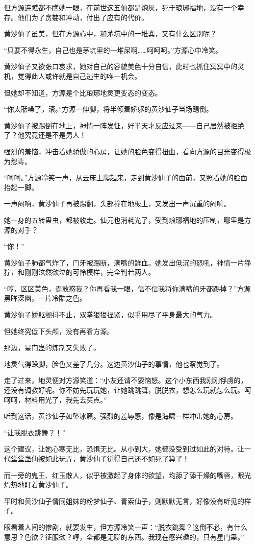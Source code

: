 \begin{this_body}
但方源连瞧都不瞧她一眼，在前世这五仙都是炮灰，死于琅琊福地，没有一个幸存。他们为了贪婪和冲动，付出了应有的代价。

黄沙仙子虽美，但在方源心中，和茅坑中的一堆粪，又有什么区别呢？

“只要不得永生，自己也是茅坑里的一堆屎啊……呵呵呵。”方源心中冷笑。

黄沙仙子又欲张口哀求，她对自己的容貌美色十分自信，此时也抓住冥冥中的灵机，觉得此人或许就是自己逃生的唯一机会。

但她却不知道，方源是个比琅琊地灵更变态的变态。

“你太聒噪了，滚。”方源一伸脚，将半倾着娇躯的黄沙仙子当场踢倒。

黄沙仙子被踢倒在地上，神情一阵发怔，好半天才反应过来——自己居然被拒绝了？他究竟还是不是男人！

强烈的羞恼，冲击着她骄傲的心房，让她的脸色变得扭曲，看向方源的目光变得极为怨毒。

“呵呵。”方源冷笑一声，从云床上爬起来，走到黄沙仙子的面前，又照着她的脸面抬起一脚。

一声闷响，黄沙仙子再被踢翻，头部撞在地板上，又发出一声沉重的闷响。

她一身的五转蛊虫，都被收走。仙元也消耗光了，受到琅琊福地的压制，哪里是方源的对手？

“你！”

黄沙仙子肺都气炸了，门牙被踢断，满嘴的鲜血。她发出低沉的怒吼，神情一片狰狞，和刚刚泫然欲泣的可怜模样，完全判若两人。

“哼，区区美色，焉敢惑我？你再看我一眼，信不信我将你满嘴的牙都踢掉？”方源黑眸深幽，一片冷酷之色。

黄沙仙子娇躯颤抖不止，双拳狠狠捏紧，似乎用尽了平身最大的气力。

但她终究低下头颅，没有再看方源。

那边，星门蛊的炼制又失败了。

地灵气得跺脚，脸色又差了几分。这边黄沙仙子的事情，他也察觉到了。

走了过来，地灵便对方源笑道：“小友还请不要恼怒。这个小东西我刚刚俘虏的，还没有调教好呢。你不妨先玩玩她，让她跳跳舞，脱脱衣，想怎么玩就怎么玩。呵呵呵，材料用光了，我先去买点。”

听到这话，黄沙仙子如坠冰窟。强烈的羞辱感，像是海啸一样冲击她的心房。

“让我脱衣跳舞？！”

这个建议，让她心寒无比，恐惧无比。从小到大，她都没受到过如此的对待。让一代堂堂蛊仙被如此玩弄，黄沙仙子觉得自己还不如死了算了！

而一旁的鬼王、红玉散人，似乎被激起了身体的欲望，均舔了舔干燥的嘴唇，眼光灼热地盯着黄沙仙子。

平时和黄沙仙子情同姐妹的粉梦仙子、青索仙子，则默默无言，好像没有听见的样子。

眼看着人间的惨剧，就要发生，但方源冷笑一声：“脱衣跳舞？这倒不必，有什么意思？色欲？征服欲？哼，全都是无聊的东西。我现在感兴趣的，只有星门蛊。”

\end{this_body}

